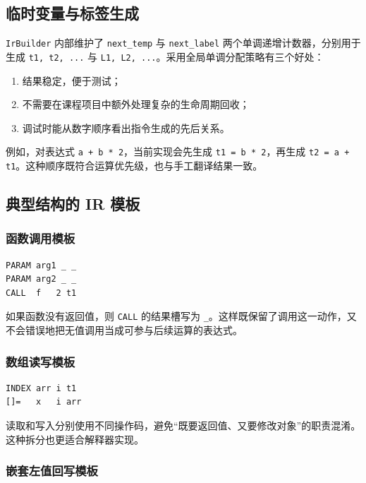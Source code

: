 \documentclass[UTF8,a4paper,12pt]{ctexart}
\newcommand{\pkg}[1]{\texttt{#1}}
\begin{document}
\subsection{临时变量与标签生成}

\pkg{IrBuilder} 内部维护了 \pkg{next\_temp} 与 \pkg{next\_label} 两个单调递增计数器，分别用于生成 \pkg{t1, t2, ...} 与 \pkg{L1, L2, ...}。采用全局单调分配策略有三个好处：

\begin{enumerate}[label=\arabic*.]
    \item 结果稳定，便于测试；
    \item 不需要在课程项目中额外处理复杂的生命周期回收；
    \item 调试时能从数字顺序看出指令生成的先后关系。
\end{enumerate}

例如，对表达式 \pkg{a + b * 2}，当前实现会先生成 \pkg{t1 = b * 2}，再生成 \pkg{t2 = a + t1}。这种顺序既符合运算优先级，也与手工翻译结果一致。

\subsection{典型结构的 IR 模板}

\subsubsection{函数调用模板}

\begin{lstlisting}[style=textStyle,caption={函数调用的典型四元式模板}]
PARAM arg1 _ _
PARAM arg2 _ _
CALL  f   2 t1
\end{lstlisting}

如果函数没有返回值，则 \pkg{CALL} 的结果槽写为 \pkg{\_}。这样既保留了调用这一动作，又不会错误地把无值调用当成可参与后续运算的表达式。

\subsubsection{数组读写模板}

\begin{lstlisting}[style=textStyle,caption={数组元素读取与写入模板}]
INDEX arr i t1
[]=   x   i arr
\end{lstlisting}

读取和写入分别使用不同操作码，避免“既要返回值、又要修改对象”的职责混淆。这种拆分也更适合解释器实现。

\subsubsection{嵌套左值回写模板}
\end{document}

